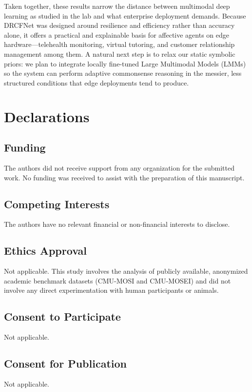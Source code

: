 \documentclass[sn-mathphys,Numbered]{sn-jnl}
\theoremstyle{thmstyleone}
\theoremstyle{thmstyletwo}
\theoremstyle{thmstylethree}
\begin{document}
Taken together, these results narrow the distance between multimodal deep learning as studied in the lab and what enterprise deployment demands. Because DRCFNet was designed around resilience and efficiency rather than accuracy alone, it offers a practical and explainable basis for affective agents on edge hardware---telehealth monitoring, virtual tutoring, and customer relationship management among them. A natural next step is to relax our static symbolic priors: we plan to integrate locally fine-tuned Large Multimodal Models (LMMs) so the system can perform adaptive commonsense reasoning in the messier, less structured conditions that edge deployments tend to produce.
\section*{Declarations}

\subsection*{Funding}
The authors did not receive support from any organization for the submitted work. No funding was received to assist with the preparation of this manuscript.

\subsection*{Competing Interests}
The authors have no relevant financial or non-financial interests to disclose.

\subsection*{Ethics Approval}
Not applicable. This study involves the analysis of publicly available, anonymized academic benchmark datasets (CMU-MOSI and CMU-MOSEI) and did not involve any direct experimentation with human participants or animals.

\subsection*{Consent to Participate}
Not applicable.

\subsection*{Consent for Publication}
Not applicable.
\end{document}
